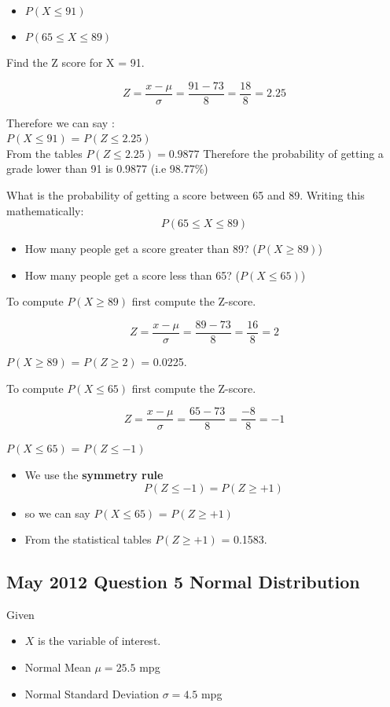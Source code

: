 \begin{itemize}
	\item $P(X \leq 91)$
	\item $P(65 \leq X \leq 89)$
\end{itemize}
Find the Z score for X = 91.

\[ Z = \frac{x- \mu}{ \sigma} = \frac{91 - 73}{8} =\frac{18}{8} = 2.25\]

Therefore we can say :\\ $P(X \leq 91)$ = $P(Z \leq 2.25)$ \\


From the tables $P(Z \leq 2.25) = 0.9877$
Therefore the probability of getting a grade lower than 91 is 0.9877 (i.e 98.77\%)


What is the probability of getting a score between 65 and 89.
Writing this mathematically:
\[ P(65 \leq X \leq 89) \]

\begin{itemize}
	\item How many people get a score greater than 89? ($P(X\geq 89)$)
	\item How many people get a score less than 65? ($P(X\leq 65)$)
\end{itemize}

To compute $P(X \geq 89)$ first compute the Z-score.

\[ Z = \frac{x - \mu}{\sigma} = \frac{89 - 73}{8} =\frac{16}{8} = 2 \]

$P(X \geq 89)$ = $P(Z \geq 2)$ = 0.0225.

To compute $P(X \leq 65)$ first compute the Z-score.

\[ Z = \frac{x - \mu}{\sigma} = \frac{65 - 73}{8} =\frac{-8}{8} = -1 \]

$P(X \leq 65)$ = $P(Z \leq -1)$ 

\begin{itemize}
	\item We use the \textbf{symmetry rule}
	\[ P(Z \leq -1) = P(Z \geq +1) \]
	\item so we can say $P(X \leq 65)$ = $P(Z \geq +1)$ 
	\item From the statistical tables $P(Z \geq +1)$ = 0.1583.
\end{itemize}



\subsection{May 2012 Question 5 Normal Distribution }
Given
\begin{itemize}
	\item $X$ is the variable of interest.
	\item Normal Mean $\mu =25.5$ mpg
	\item Normal Standard Deviation $\sigma =4.5$ mpg
\end{itemize}

